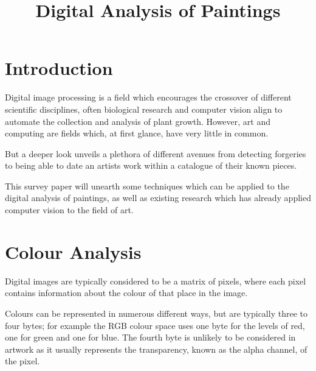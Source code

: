\documentclass[conference]{IEEEtran}
\begin{document}
\title{Digital Analysis of Paintings}

\author{
}

\maketitle

\begin{abstract}
\end{abstract}


\IEEEpeerreviewmaketitle

\section{Introduction}
Digital image processing is a field which encourages the crossover of different
scientific disciplines, often biological research and computer vision align to
automate the collection and analysis of plant growth. However, art and
computing are fields which, at first glance, have very little in common.

But a deeper look unveils a plethora of different avenues from detecting
forgeries to being able to date an artists work within a catalogue of their
known pieces.

This survey paper will unearth some techniques which can be applied to the
digital analysis of paintings, as well as existing research which has already
applied computer vision to the field of art.

\section{Colour Analysis}
Digital images are typically considered to be a matrix of pixels, where each
pixel contains information about the colour of that place in the image.

Colours can be represented in numerous different ways, but are typically three
to four bytes; for example the \gls{RGB} colour space uses one byte for the
levels of red, one for green and one for blue. The fourth byte is unlikely to
be considered in artwork as it usually represents the transparency, known as
the alpha channel, of the pixel.
\end{document}
